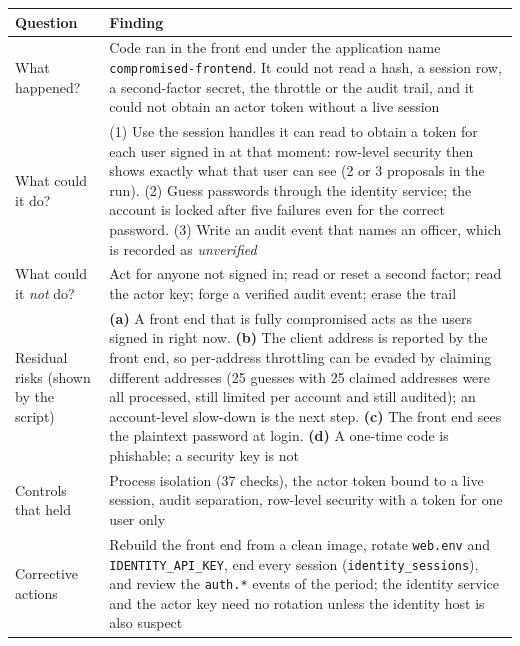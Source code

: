 \documentclass[10pt,a4paper]{article}
\newcommand{\code}[1]{\nolinkurl{#1}}
\begin{document}
\begin{center}\small
\begin{tabularx}{\linewidth}{@{}L{3.6cm}Y@{}}
\toprule\textbf{Question} & \textbf{Finding}\\\midrule
What happened? & Code ran in the front end under the application name \code{compromised-frontend}. It could not read a hash, a session row, a second-factor secret, the throttle or the audit trail, and it could not obtain an actor token without a live session\\
What could it do? & (1) Use the session handles it can read to obtain a token for each user signed in at that moment: row-level security then shows exactly what that user can see (2 or 3 proposals in the run). (2) Guess passwords through the identity service; the account is locked after five failures even for the correct password. (3) Write an audit event that names an officer, which is recorded as \emph{unverified}\\
What could it \emph{not} do? & Act for anyone not signed in; read or reset a second factor; read the actor key; forge a verified audit event; erase the trail\\
Residual risks (shown by the script) & \textbf{(a)} A front end that is fully compromised acts as the users signed in right now. \textbf{(b)} The client address is reported by the front end, so per-address throttling can be evaded by claiming different addresses (25 guesses with 25 claimed addresses were all processed, still limited per account and still audited); an account-level slow-down is the next step. \textbf{(c)} The front end sees the plaintext password at login. \textbf{(d)} A one-time code is phishable; a security key is not\\
Controls that held & Process isolation (37 checks), the actor token bound to a live session, audit separation, row-level security with a token for one user only\\
Corrective actions & Rebuild the front end from a clean image, rotate \code{web.env} and \code{IDENTITY\_API\_KEY}, end every session (\code{identity\_sessions}), and review the \code{auth.*} events of the period; the identity service and the actor key need no rotation unless the identity host is also suspect\\
\bottomrule\end{tabularx}\end{center}
\end{document}
